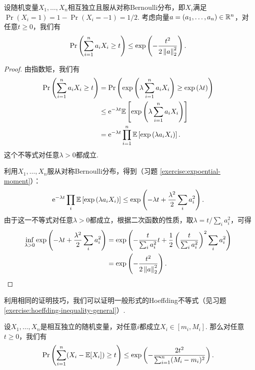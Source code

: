 \begin{theorem}\label{theorem:hoeffding-inequality}
    设随机变量$X_1, \dots, X_n$相互独立且服从对称Bernoulli分布，即$X_i$满足$\Pr(X_i=1)=1-\Pr(X_i=-1)=1/2$. 考虑向量$a = (a_1, \dots, a_n) \in \mathbb{R}^n$，对任意$t\geq0$，我们有
    \[
        \Pr\left(\sum_{i=1}^n a_i X_i \geq t\right)\leq \exp \left( - \frac{t^2}{2\left\|a\right\|^2_2}\right).
    \]
\end{theorem}
\begin{proof}
由指数矩，我们有
\[
\begin{aligned}
    \Pr\left(\sum_{i=1}^n a_i X_i \geq t\right) &= \Pr\left(\exp\left(\lambda \sum_{i=1}^n a_i X_i\right) \geq \exp\left(\lambda t\right)\right) \\
    &\leq \mathrm{e}^{-\lambda t} \mathbb{E} \left[\exp\left(\lambda \sum_{i=1}^n a_i X_i\right)\right]\\
    &=  \mathrm{e}^{-\lambda t}\prod_{i=1}^n \mathbb{E}\left[\exp\left(\lambda a_i X_i\right)\right].
\end{aligned}
\]
这个不等式对任意$\lambda > 0$都成立. 

利用$X_1, \dots, X_n$服从对称Bernoulli分布，得到（习题 \ref{exercise:expoential-moment}）：
\begin{equation}
\mathrm{e}^{-\lambda t}\prod_{i} \mathbb{E}\left[\exp\left(\lambda a_i X_i\right)\right]\leq\exp \left(-\lambda t + \frac{\lambda^2}{2} \sum_{i} a_i^2\right).\label{eq:exponential-moment}
\end{equation}
由于这一不等式对任意$\lambda > 0$都成立，根据二次函数的性质，取$\lambda = t / \sum_i a_i^2$，可得
\[
\begin{aligned}
    \inf_{\lambda>0}\exp \left(-\lambda t + \frac{\lambda^2}{2} \sum_{i} a_i^2\right) &=\exp\left( -\frac{t}{\sum_i a_i^2} t + \frac12 \left(\frac{t}{\sum_i a_i^2}\right)^2 \sum_{i} a_i^2\right) \\
    &= \exp \left( - \frac{t^2}{2\left\|a\right\|_2^2}\right).
\end{aligned}
\]
\end{proof}

利用相同的证明技巧，我们可以证明一般形式的Hoeffding不等式（见习题 \ref{exercise:hoeffding-inequality-general}）.

\begin{theorem}\label{theorem:hoeffding-inequality-general}
    设$X_1, \dots, X_n$是相互独立的随机变量，对任意$i$都成立$X_i \in [m_i, M_i]$. 那么对任意$t\geq0$，我们有
    \[
        \Pr\left(\sum_{i=1}^n (X_i - \mathbb{E} [X_i]) \geq t\right) \leq \exp \left( - \frac{2t^2}{\sum_{i=1}^n (M_i - m_i)^2}\right).
    \]
\end{theorem}

